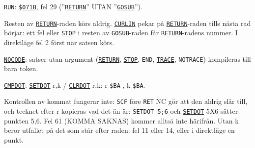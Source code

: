 \begin{Listing}
\begin{Note}
\begin{Punkter}
\item \texttt{RUN}: \hyperlink{a:071B}{\texttt{\$071B}}, fel 29 (”\hyperlink{l:RETURN}{\texttt{RETURN}}” UTAN ”\hyperlink{l:GOSUB}{\texttt{GOSUB}}”).
\end{Punkter}
\par\noindent Resten av \hyperlink{l:RETURN}{\texttt{RETURN}}-raden körs aldrig. \hyperlink{v:CURLIN}{\texttt{CURLIN}} pekar på \hyperlink{l:RETURN}{\texttt{RETURN}}-raden tills nästa rad börjar: ett fel eller \hyperlink{l:STOP}{\texttt{STOP}} i resten av \hyperlink{l:GOSUB}{\texttt{GOSUB}}-raden får \hyperlink{l:RETURN}{\texttt{RETURN}}-radens nummer. I direktläge fel 2 först när satsen körs.\par\end{Note}
\Gap
\begin{Cmt}\par\noindent \hyperlink{l:NOCODE}{\texttt{NOCODE}}: satser utan argument (\hyperlink{l:RETURN}{\texttt{RETURN}}, \hyperlink{l:STOP}{\texttt{STOP}}, \texttt{END}, \hyperlink{l:TRACE}{\texttt{TRACE}}, \texttt{NOTRACE}) kompileras till bara token.\par\end{Cmt}
\Gap
\begin{Cmt}\par\noindent \hyperlink{l:CMPDOT}{\texttt{CMPDOT}}: \hyperlink{l:SETDOT}{\texttt{SETDOT}} r,k / \hyperlink{l:CLRDOT}{\texttt{CLRDOT}} r,k:  r \texttt{\$BA} {},{} k \texttt{\$BA}.\par
\par\noindent Kontrollen av kommat fungerar inte: \texttt{SCF} före \texttt{RET} NC gör att den aldrig slår till, och tecknet efter r kopieras vad det än är: {}\texttt{SETDOT 5;6}{} och {}\hyperlink{l:SETDOT}{\texttt{SETDOT}} 5X6{} sätter punkten 5,6. Fel 61 (KOMMA SAKNAS) kommer alltså inte härifrån. Utan k beror utfallet på det som står efter raden: fel 11 eller 14, eller i direktläge en punkt.\par\end{Cmt}

\end{Listing}
